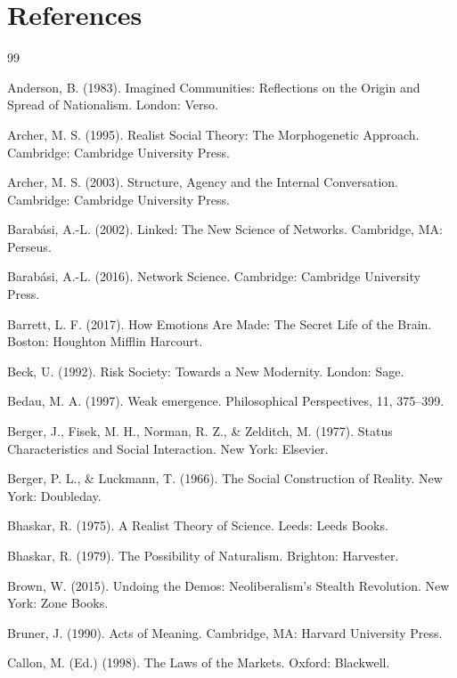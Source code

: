 \documentclass[12pt,a4paper]{article}
\begin{document}
\section*{References}
\begin{thebibliography}{99}

 Anderson, B. (1983). Imagined Communities: Reflections on the Origin and Spread of Nationalism. London: Verso.

 Archer, M. S. (1995). Realist Social Theory: The Morphogenetic Approach. Cambridge: Cambridge University Press.

 Archer, M. S. (2003). Structure, Agency and the Internal Conversation. Cambridge: Cambridge University Press.

 Barabási, A.-L. (2002). Linked: The New Science of Networks. Cambridge, MA: Perseus.

 Barabási, A.-L. (2016). Network Science. Cambridge: Cambridge University Press.

 Barrett, L. F. (2017). How Emotions Are Made: The Secret Life of the Brain. Boston: Houghton Mifflin Harcourt.

 Beck, U. (1992). Risk Society: Towards a New Modernity. London: Sage.

 Bedau, M. A. (1997). Weak emergence. Philosophical Perspectives, 11, 375--399.

 Berger, J., Fisek, M. H., Norman, R. Z., \& Zelditch, M. (1977). Status Characteristics and Social Interaction. New York: Elsevier.

 Berger, P. L., \& Luckmann, T. (1966). The Social Construction of Reality. New York: Doubleday.

 Bhaskar, R. (1975). A Realist Theory of Science. Leeds: Leeds Books.

 Bhaskar, R. (1979). The Possibility of Naturalism. Brighton: Harvester.

 Brown, W. (2015). Undoing the Demos: Neoliberalism's Stealth Revolution. New York: Zone Books.

 Bruner, J. (1990). Acts of Meaning. Cambridge, MA: Harvard University Press.

 Callon, M. (Ed.) (1998). The Laws of the Markets. Oxford: Blackwell.


\end{thebibliography}
\end{document}
